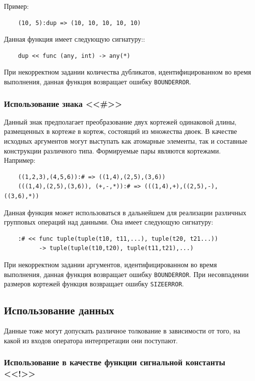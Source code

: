 Пример:

\begin{verbatim}
    (10, 5):dup => (10, 10, 10, 10, 10)
\end{verbatim}

Данная функция имеет следующую сигнатуру::

\begin{verbatim}
    dup << func (any, int) -> any(*)
\end{verbatim}

При некорректном задании количества дубликатов, идентифицированном во время выполнения, данная функция возвращает ошибку \verb|BOUNDERROR|.

\subsubsection{Использование знака <<\#>>}

Данный знак предполагает преобразование двух кортежей одинаковой длины, размещенных в кортеже в кортеж, состоящий из множества двоек. В качестве исходных аргументов могут выступать как атомарные элементы, так и составные конструкции различного типа. Формируемые пары являются кортежами. Например:

\begin{verbatim}
    ((1,2,3),(4,5,6)):# => ((1,4),(2,5),(3,6))
    (((1,4),(2,5),(3,6)), (+,-,*)):# => (((1,4),+),((2,5),-),((3,6),*))
\end{verbatim}
Данная функция может использоваться в дальнейшем для реализации различных групповых операций над данными. Она имеет следующую сигнатуру:

\begin{verbatim}
    :# << func tuple(tuple(t10, t11,...), tuple(t20, t21...))
          -> tuple(tuple(t10,t20), tuple(t11,t21),...)
\end{verbatim}
При некорректном задании аргументов, идентифицированном во время выполнения, данная функция возвращает ошибку \verb|BOUNDERROR|. При несовпадении размеров кортежей функция возвращает ошибку \verb|SIZEERROR|.

\subsection{Использование данных}

Данные тоже могут допускать различное толкование в зависимости от того, на какой из входов оператора интерпретации они поступают.

\subsubsection{Использование в качестве функции сигнальной константы <<!>>}

